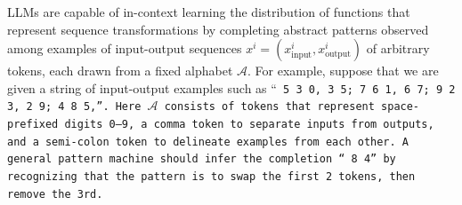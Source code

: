 

LLMs are capable of in-context learning the distribution of functions that represent sequence transformations by completing abstract patterns observed among examples of input-output sequences $x^{i} = (x^{i}_{\text{input}}, x^{i}_{\text{output}})$ of arbitrary tokens, each drawn from a fixed alphabet $\mathcal{A}$. For example, suppose that we are given a string of input-output examples such as ``\tt{ 5 3 0, 3 5; 7 6 1, 6 7; 9 2 3, 2 9; 4 8 5,}''. Here $\mathcal{A}$ consists of tokens that represent space-prefixed digits 0--9, a comma token to separate inputs from outputs, and a semi-colon token to delineate examples from each other. A general pattern machine should infer the completion ``\tt{ 8 4}'' by recognizing that the pattern is to swap the first 2 tokens, then remove the 3rd.

